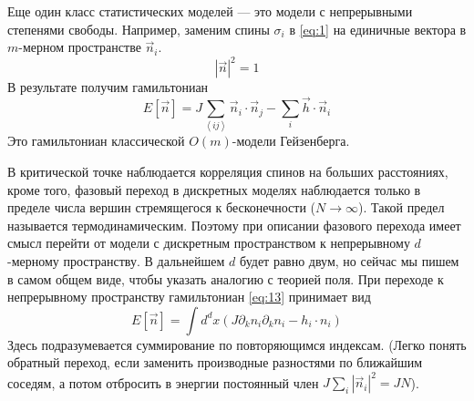 \documentclass[a4paper,12pt]{article}
\theoremstyle{definition}
\theoremstyle{definition}
\theoremstyle{definition}
\begin{document}
Еще один класс статистических моделей --- это модели с непрерывными степенями свободы. Например,
заменим спины $\sigma_i$ в \eqref{eq:1} на единичные вектора в $m$-мерном пространстве $\vec n_i$.
\begin{equation}
  \label{eq:14}
  \left|\vec n\right|^2=1
\end{equation}
В результате получим гамильтониан
\begin{equation}
  \label{eq:13}
  E[\vec n]=J\sum_{\left<ij\right>}\vec n_i\cdot \vec n_j-\sum_i \vec h\cdot \vec n_i
\end{equation}
Это гамильтониан классической $O(m)$-модели Гейзенберга. 

В критической точке наблюдается корреляция спинов на больших расстояниях, кроме того, фазовый переход
в дискретных моделях наблюдается только в пределе числа вершин стремящегося к бесконечности ($N\to
\infty$). Такой предел называется термодинамическим. Поэтому при описании фазового перехода имеет
смысл перейти от модели с дискретным пространством к непрерывному $d$-мерному пространству. В
дальнейшем $d$ будет равно двум, но сейчас мы пишем в самом общем виде, чтобы указать аналогию с
теорией поля. При переходе к непрерывному пространству гамильтониан \eqref{eq:13} принимает вид
\begin{equation}
  \label{eq:15}
  E[\vec n]=\int d^d x \left(J\partial_kn_i\partial_k  n_i-h_i\cdot n_i\right)
\end{equation}
Здесь подразумевается суммирование по повторяющимся индексам. (Легко понять обратный переход, если
заменить производные разностями по ближайшим соседям, а потом отбросить в энергии постоянный член
$J\sum_i \left|\vec n_i\right|^2=JN$).
\end{document}
